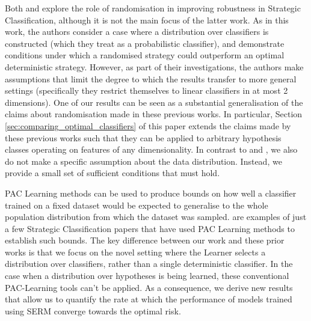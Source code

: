 Both \cite{braverman2020} and \cite{sundaram2023} explore the role of randomisation in improving robustness in Strategic Classification, although it is not the main focus of the latter work. As in this work, the authors consider a case where a distribution over classifiers is constructed (which they treat as a probabilistic classifier), and demonstrate conditions under which a randomised strategy could outperform an optimal deterministic strategy. However, as part of their investigations, the authors make assumptions that limit the degree to which the results transfer to more general settings (specifically they restrict themselves to linear classifiers in at most 2 dimensions). One of our results can be seen as a substantial generalisation of the claims about randomisation made in these previous works. In particular, Section \ref{sec:comparing_optimal_classifiers} of this paper extends the claims made by these previous works such that they can be applied to arbitrary hypothesis classes operating on features of any dimensionality. In contrast to \citet{braverman2020} and \citet{sundaram2023}, we also do not make a specific assumption about the data distribution. Instead, we provide a small set of sufficient conditions that must hold.

PAC Learning methods \citep{valiant1984} can be used to produce bounds on how well a classifier trained on a fixed dataset would be expected to generalise to the whole population distribution from which the dataset was sampled. \citet{zhang2021, sundaram2023, cullina2018} are examples of just a few Strategic Classification papers that have used PAC Learning methods to establish such bounds. The key difference between our work and these prior works is that we focus on the novel setting where the Learner selects a distribution over classifiers, rather than a single deterministic classifier. In the case when a distribution over hypotheses is being learned, these conventional PAC-Learning tools can't be applied. As a consequence, we derive new results that allow us to quantify the rate at which the performance of models trained using SERM converge towards the optimal risk.